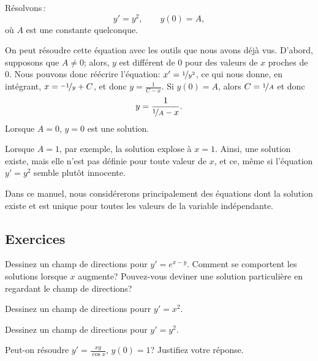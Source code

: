 \begin{example}
Résolvons\,:
\begin{equation*}
	y' = y^2, \qquad y(0) = A, 
\end{equation*}
où $A$ est une constante quelconque.

On peut résoudre cette équation avec les outils que nous avons déjà vus.  D'abord, supposons que $A \not= 0$;
alors, $y$ est différent de 0 pour des valeurs de $x$ proches de 0.  Nous pouvons donc réécrire l'équation: 
$x' = \nicefrac{1}{y^2}$, ce qui nous donne, en intégrant, 
$x = \nicefrac{-1}{y} + C$, et donc $y = \frac{1}{C-x}$.  Si $y(0) = A$, alors
$C = \nicefrac{1}{A}$ et donc 
\begin{equation*}
y = \frac{1}{\nicefrac{1}{A} - x} .
\end{equation*}
Lorsque $A=0$,  $y=0$ est une solution.

Lorsque $A=1$, par exemple, la solution \og{}explose\fg{} à  $x=1$.  Ainsi, une solution existe, mais elle n'est pas définie pour toute valeur de $x$, et ce, même si l'équation $y' = y^2$ semble plutôt innocente.
\end{example}

Dans ce manuel, nous considérerons principalement des équations dont la solution existe et est unique pour toutes les
valeurs de la variable indépendante.

\subsection{Exercices}

\begin{exercise}
Dessinez un champ de directions pour $y'=e^{x-y}$.  Comment se comportent les solutions lorsque $x$ augmente? Pouvez-vous deviner une solution particulière en regardant le champ de directions?
\end{exercise}

\begin{exercise}
Dessinez un champ de directions pourr $y'=x^2$.
\end{exercise}

\begin{exercise}
Dessinez un champ de directions pour $y'=y^2$.
\end{exercise}

\begin{exercise}
Peut-on résoudre $y' = \frac{xy}{\cos x}$, $y(0) = 1$?
Justifiez votre réponse.
\end{exercise}

